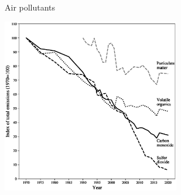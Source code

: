 \begin{frame}{Air pollutants}
\begin{center}
\includegraphics[height=3in]{../Figures/fig-ch10-fig8.eps}
\end{center}
\end{frame}

